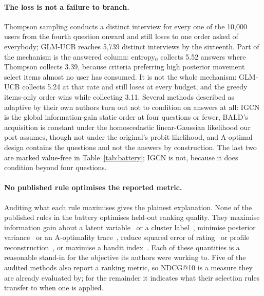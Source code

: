 \documentclass[runningheads]{llncs}
\begin{document}
\paragraph{The loss is not a failure to branch.}
Thompson sampling conducts a distinct interview for every one of the 10{,}000 users from the fourth
question onward and still loses to one order asked of everybody; GLM-UCB reaches 5{,}739 distinct
interviews by the sixteenth. Part of the mechanism is the answered column: entropy$_0$ collects 5.52
answers where Thompson collects 3.39, because criteria preferring high posterior movement select
items almost no user has consumed. It is not the whole mechanism: GLM-UCB collects 5.24 at that rate
and still loses at every budget, and the greedy items-only order wins while collecting 3.11. Several methods described as adaptive by their own authors turn out not to condition on
answers at all: IGCN is the global information-gain static order at four questions or fewer, BALD's
acquisition is constant under the homoscedastic linear-Gaussian likelihood our port assumes, though
not under the original's probit likelihood, and A-optimal design contains the questions and not the
answers by construction. The last two are marked value-free in
Table~\ref{tab:battery}; IGCN is not, because it does condition beyond four questions.

\paragraph{No published rule optimises the reported metric.}
Auditing what each rule maximises gives the plainest explanation. None of the published rules in the
battery optimises held-out ranking quality. They maximise information gain about a latent variable~\cite{ma2019eddi}
or a cluster label~\cite{rashid2008learning}, minimise posterior
variance~\cite{houlsby2011bald} or an A-optimality trace~\cite{anava2015budget,sepliarskaia2018spq},
reduce squared error of rating~\cite{golbandi2011adaptive,zhou2011functional} or profile
reconstruction~\cite{kweon2020deep,proissl2024greedyslim}, or maximise a bandit
index~\cite{zhao2013interactive,zhang2020conucb,wang2023conlinucb,liu2025clisk,parapar2021dpe}.
Each of these quantities is a reasonable stand-in for the objective its authors were working to.
Five of the audited methods also report a ranking metric, so NDCG@10 is a measure they are already
evaluated by; for the remainder it indicates what their selection rules transfer to when one is
applied.
\end{document}
